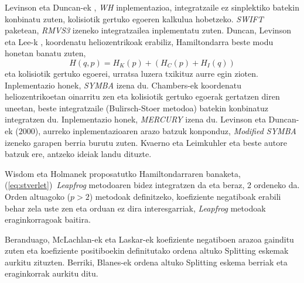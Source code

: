 Levinson eta Duncan-ek \cite[1994]{Levison1994}, \emph{WH} inplementazioa, integratzaile ez sinplektiko batekin konbinatu zuten, kolisiotik gertuko egoeren kalkulua hobetzeko. \emph{SWIFT} paketean, \emph{RMVS3} izeneko integratzailea inplementatu zuten. Duncan, Levinson eta Lee-k \cite[1998]{Duncan1998}, koordenatu heliozentrikoak erabiliz, Hamiltondarra beste modu honetan banatu zuten,  
\begin{equation*}
H(q,p)=H_K(p)+(H_C(p)+H_I(q))
\end{equation*}
eta kolisiotik gertuko egoerei, urratsa luzera txikituz aurre egin zioten. Inplementazio honek, \emph{SYMBA} izena du. Chambers-ek \cite{Chambers1999} koordenatu heliozentrikoetan oinarritu zen eta kolisiotik gertuko egoerak gertatzen diren uneetan, beste integratzaile  (Bulirsch-Stoer metodoa) batekin konbinatuz integratzen du. Inplementazio honek, \emph{MERCURY} izena du. Levinson eta Duncan-ek ($2000$), aurreko inplementazioaren arazo batzuk konponduz, \emph{Modified SYMBA} izeneko garapen berria burutu zuten.
Kvaerno eta Leimkuhler \cite{Kvaerno2000} eta beste autore batzuk ere, antzeko ideiak landu dituzte.

Wisdom eta Holmanek proposatutko Hamiltondarraren banaketa, (\ref{eq:stverlet})~\emph{Leapfrog} metodoaren bidez integratzen da eta beraz, 2 ordeneko da. Orden altuagoko ($p>2$) metodoak definitzeko, koefiziente negatiboak erabili behar zela uste zen \cite{Yoshida1993,Laskar2001} eta orduan ez dira interesgarriak, \emph{Leapfrog} metodoak eraginkorragoak baitira. 


Beranduago, McLachlan-ek \cite[1995]{McLachlan1995} eta Laskar-ek  \cite[2001]{Laskar2001} koefiziente negatiboen arazoa gainditu zuten eta koefiziente positiboekin definitutako ordena altuko Splitting eskemak aurkitu zituzten. Berriki, Blanes-ek \cite[2012]{Blanes2013} ordena altuko Splitting eskema berriak eta eraginkorrak aurkitu ditu. 

